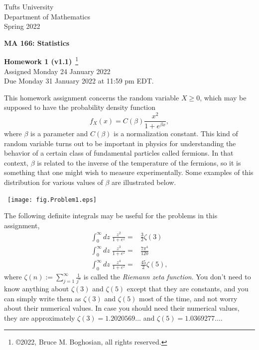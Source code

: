 \documentclass [12pt] {article}
\begin{document}
\thispagestyle{empty}
\begin{center}
Tufts University\\
Department of Mathematics\\
Spring 2022 \\
\end{center}
\begin{center}
{\bf MA 166: Statistics}\\
\end{center}
\begin{center}
{\bf\Large Homework 1 {\small (v1.1)}}~\footnote{\copyright 2022, Bruce M. Boghosian, all rights reserved.}\\
Assigned Monday 24 January 2022\\
Due Monday 31 January 2022 at 11:59 pm EDT.
\end{center}

This homework assignment concerns the random variable $X\geq 0$, which may be supposed to have the probability density function
\[
f_X(x) = C(\beta)\frac{x^2}{1+e^{\beta x}},
\]
where $\beta$ is a parameter and $C(\beta)$ is a normalization constant.  This kind of random variable turns out to be important in physics for understanding the behavior of a certain class of fundamental particles called fermions.  In that context, $\beta$ is related to the inverse of the temperature of the fermions, so it is something that one might wish to measure experimentally.  Some examples of this distribution for various values of $\beta$ are illustrated below.
\begin{center}
\mbox{
\texttt{[image: fig.Problem1.eps]}
}
\end{center}

The following definite integrals may be useful for the problems in this assignment,
	\begin{align*}
	\int_0^\infty dz\; \frac{z^2}{1+e^z} =& \frac{3}{2}\zeta(3)\\
	\int_0^\infty dz\; \frac{z^3}{1+e^z} =& \frac{7\pi^4}{120}\\
	\int_0^\infty dz\; \frac{z^4}{1+e^z} =& \frac{45}{2}\zeta(5),
	\end{align*}
where $\zeta(n) := \sum_{j=1}^\infty\frac{1}{j^n}$ is called the \textit{Riemann zeta function}.  You don't need to know anything about $\zeta(3)$ and $\zeta(5)$ except that they are constants, and you can simply write them as $\zeta(3)$ and $\zeta(5)$ most of the time, and not worry about their numerical values.  In case you should need their numerical values, they are approximately $\zeta(3) = 1.2020569\ldots$ and $\zeta(5) = 1.0369277\ldots$.
\end{document}
